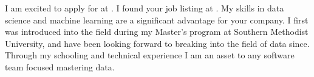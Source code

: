 




I am excited to apply for \position   at \company. I found your job listing at \source.
My skills in data science and machine learning are a significant advantage for your company. 
I first was introduced into the field during my Master's program at Southern Methodist University, and have been looking forward to breaking into the field of data since.
Through my schooling and technical experience I am an asset to any software team focused mastering data.
